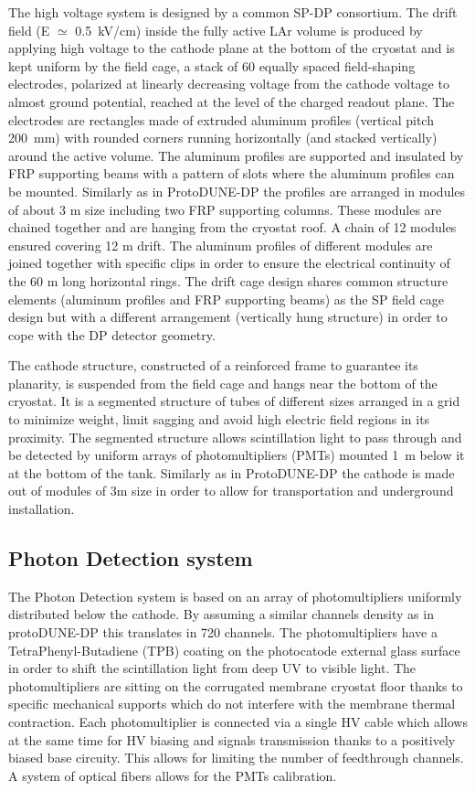 The high voltage system is designed by a common SP-DP consortium.
The drift field (E ${\simeq}$ 0.5~kV/cm) inside the fully active LAr volume is produced by applying high voltage to the cathode plane at the bottom of the cryostat and is kept uniform by the field cage, a stack of 60 equally spaced field-shaping electrodes,  polarized at linearly decreasing voltage from the cathode  voltage to almost ground potential, reached at the level of the charged readout plane. The electrodes are rectangles made of extruded aluminum profiles   (vertical pitch 200~mm) with rounded corners running horizontally (and stacked vertically) around the active volume. The aluminum profiles are supported and insulated by FRP supporting beams with a pattern of slots where the aluminum profiles can be mounted. Similarly as in ProtoDUNE-DP the profiles are arranged in modules of about 3 m size including two FRP supporting columns. These modules are chained together and  are hanging from the cryostat roof. A chain of 12 modules ensured covering 12 m drift. The aluminum profiles of different modules are joined together with specific clips in order to ensure the electrical continuity of the 60 m long horizontal rings.  The drift cage design shares common structure elements (aluminum profiles and FRP supporting beams) as the SP field cage design but with a different arrangement (vertically hung structure) in order to cope with the DP detector geometry.

The cathode structure, constructed of a reinforced frame to guarantee its planarity, is suspended from the field cage and hangs near the 
bottom of the cryostat. It is a segmented structure of tubes of different sizes  arranged in a grid to minimize weight, limit sagging and avoid high electric field
regions in its proximity.  The segmented structure allows scintillation light to pass through and be detected by uniform arrays of photomultipliers (PMTs) mounted 1~m below it at the bottom of the tank. Similarly as in ProtoDUNE-DP the cathode is made out of modules of 3m size in order to allow for transportation and underground installation. 

\subsection{Photon Detection system}
\label{v4:fddp-ov:pd}

The Photon Detection system is based on an array of photomultipliers uniformly distributed below the cathode. By assuming a similar channels density as in protoDUNE-DP this translates in 720 channels. The photomultipliers have a TetraPhenyl-Butadiene (TPB) coating on the photocatode external glass surface in order to shift the scintillation light from deep UV to visible light. The photomultipliers are sitting on the corrugated membrane cryostat floor thanks to specific mechanical supports which do not interfere with the membrane thermal contraction. Each photomultiplier is connected via a single HV cable which allows at the same time for HV biasing and signals transmission thanks to a positively biased base circuity. This allows for limiting the number of feedthrough channels.
A system of optical fibers allows for the PMTs calibration.  


